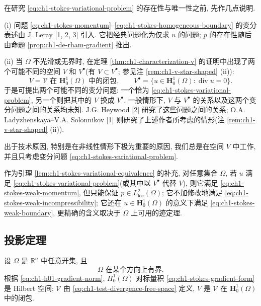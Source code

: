 \begin{Remark}
\label{rem:ch1-stokes-variational-observations}
在研究 \eqref{eq:ch1-stokes-variational-problem} 的存在性与唯一性之前, 先作几点说明.

(i) 问题 \eqref{eq:ch1-stokes-momentum}--\eqref{eq:ch1-stokes-homogeneous-boundary} 的变分表述由 J. Leray [1, 2, 3] 引入. 它把经典问题化为仅求 $u$ 的问题; $p$ 的存在性随后由命题 \ref{prop:ch1-de-rham-gradient} 推出.

(ii) 当 $\Omega$ 不光滑或无界时, 在定理 \ref{thm:ch1-characterization-v} 的证明中出现了两个可能不同的空间 $V$ 和 $V^\bullet$(有 $V\subset V^\bullet$; 参见注 \ref{rem:ch1-v-star-shaped} (ii)):
\[
V=\mathcal V\text{ 在 }\mathbf H_0^1(\Omega)\text{ 中的闭包},
\qquad
V^\bullet=\{u\in\mathbf H_0^1(\Omega):\operatorname{div}u=0\}.
\]
于是可提出两个可能不同的变分问题: 一个恰为 \eqref{eq:ch1-stokes-variational-problem}, 另一个则把其中的 $V$ 换成 $V^\bullet$. 一般情形下, $V$ 与 $V^\bullet$ 的关系以及这两个变分问题之间的关系均未知. J.G. Heywood [2] 研究了这些问题之间的关系; O.A. Ladyzhenskaya--V.A. Solonnikov [1] 则研究了上述作者所考虑的情形(注 \ref{rem:ch1-v-star-shaped} (ii)).

出于技术原因, 特别是在非线性情形下极为重要的原因, 我们总是在空间 $V$ 中工作, 并且只考虑变分问题 \eqref{eq:ch1-stokes-variational-problem}.

作为引理 \ref{lem:ch1-stokes-variational-equivalence} 的补充, 对任意集合 $\Omega$, 若 $u$ 满足 \eqref{eq:ch1-stokes-variational-problem}(或其中以 $V^\bullet$ 代替 $V$), 则它满足 \eqref{eq:ch1-stokes-weak-momentum}, 但只能保证 $p\in L^2_{\mathrm{loc}}(\Omega)$; 它不加修改地满足 \eqref{eq:ch1-stokes-weak-incompressibility}; 它还在 $u\in\mathbf H_0^1(\Omega)$ 的意义下满足 \eqref{eq:ch1-stokes-weak-boundary}, 更精确的含义取决于 $\Omega$ 上可用的迹定理.
\end{Remark}

\subsection{投影定理}
\label{subsec:ch1-projection-theorem}

设 $\Omega$ 是 $\mathbb R^n$ 中任意开集, 且
\begin{equation}
\Omega\text{ 在某个方向上有界}.
\label{eq:ch1-domain-bounded-one-direction}
\end{equation}
根据 \eqref{eq:ch1-h01-gradient-norm}, $H_0^1(\Omega)$ 对标量积 \eqref{eq:ch1-stokes-gradient-form} 是 Hilbert 空间; $\mathcal V$ 由 \eqref{eq:ch1-test-divergence-free-space} 定义, $V$ 是 $\mathcal V$ 在 $\mathbf H_0^1(\Omega)$ 中的闭包.

